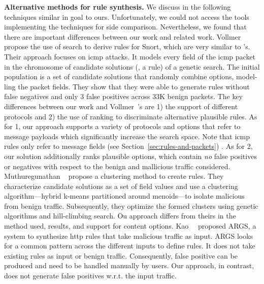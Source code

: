 \documentclass[sigconf,review, anonymous]{acmart}
\begin{document}
\noindent
\textbf{Alternative methods for rule synthesis.} We discuss in the
following techniques similar in goal to ours. Unfortunately, we could
not access the tools implementing the techniques for side
comparison. Nevertheless, we found that there are important
differences between our work and related work. Vollmer
\etal{}~\cite{vollmer-etal-cics2011} propose the use of search to
derive rules for Snort, which are very similar to \suri's.  Their
approach focuses on icmp attacks. It models every field of the icmp
packet in the chromosome of candidate solutions (\ie{}, a rule) of a
genetic search. The initial population is a set of candidate solutions
that randomly combine options, model-ling the packet fields. They show
that they were able to generate rules without false negatives and only
3 false positives across 33K benign packets. The key differences
between our work and Vollmer~\etal{}'s are 1) the support of different
protocols and 2) the use of ranking to discriminate alternative
plausible rules. As for 1, our approach supports a variety of
protocols and options that refer to message payloads which
significantly increase the search space. Note that icmp rules only
refer to message fields (see Section~\ref{sec:rules-and-packets})
. 
As for 2, our solution additionally ranks plausible options, which
contain \emph{no} false positives or negatives with respect to the
benign and mallicious traffic considered. Muthuregunathan
\etal{}~\cite{muthuregunathan-etal2009} propose a clustering method to
create rules. They characterize candidate solutions as a set of field
values and use a clustering algorithm---hybrid k-means partitioned
around menoids---to isolate malicious from benign
traffic. Subsequently, they optimize the formed clusters using genetic
algorithms and hill-climbing search. Ou approach differs from theirs
in the method used, results, and support for content
options. Kao~\etal~\cite{Kao2015AutomaticNR} proposed ARGS, a system
to synthesize http rules that take malicious traffic as input. ARGS
looks for a common pattern across the different inputs to define
rules. It does not take existing rules as input or benign
traffic. Consequently, false positive can be produced and need to be
handled manually by users. Our approach, in contrast, does not
generate false positives w.r.t. the input traffic.

\end{document}
